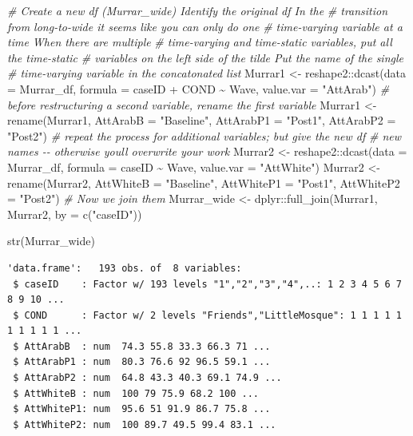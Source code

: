 \documentclass[
  11pt,
]{book}
\newenvironment{Shaded}{\begin{snugshade}}{\end{snugshade}}
\newcommand{\AttributeTok}[1]{\textcolor[rgb]{0.77,0.63,0.00}{#1}}
\newcommand{\CommentTok}[1]{\textcolor[rgb]{0.56,0.35,0.01}{\textit{#1}}}
\newcommand{\FunctionTok}[1]{\textcolor[rgb]{0.00,0.00,0.00}{#1}}
\newcommand{\NormalTok}[1]{#1}
\newcommand{\OtherTok}[1]{\textcolor[rgb]{0.56,0.35,0.01}{#1}}
\newcommand{\SpecialCharTok}[1]{\textcolor[rgb]{0.00,0.00,0.00}{#1}}
\newcommand{\StringTok}[1]{\textcolor[rgb]{0.31,0.60,0.02}{#1}}
\begin{document}
\begin{Shaded}
\begin{Highlighting}[]
\CommentTok{\# Create a new df (Murrar\_wide) Identify the original df In the}
\CommentTok{\# transition from long{-}to{-}wide it seems like you can only do one}
\CommentTok{\# time{-}varying variable at a time When there are multiple}
\CommentTok{\# time{-}varying and time{-}static variables, put all the time{-}static}
\CommentTok{\# variables on the left side of the tilde Put the name of the single}
\CommentTok{\# time{-}varying variable in the concatonated list}
\NormalTok{Murrar1 }\OtherTok{\textless{}{-}}\NormalTok{ reshape2}\SpecialCharTok{::}\FunctionTok{dcast}\NormalTok{(}\AttributeTok{data =}\NormalTok{ Murrar\_df, }\AttributeTok{formula =}\NormalTok{ caseID }\SpecialCharTok{+}\NormalTok{ COND }\SpecialCharTok{\textasciitilde{}}
\NormalTok{    Wave, }\AttributeTok{value.var =} \StringTok{"AttArab"}\NormalTok{)}
\CommentTok{\# before restructuring a second variable, rename the first variable}
\NormalTok{Murrar1 }\OtherTok{\textless{}{-}} \FunctionTok{rename}\NormalTok{(Murrar1, }\AttributeTok{AttArabB =} \StringTok{"Baseline"}\NormalTok{, }\AttributeTok{AttArabP1 =} \StringTok{"Post1"}\NormalTok{,}
    \AttributeTok{AttArabP2 =} \StringTok{"Post2"}\NormalTok{)}
\CommentTok{\# repeat the process for additional variables; but give the new df}
\CommentTok{\# new names {-}{-} otherwise you\textquotesingle{}ll overwrite your work}
\NormalTok{Murrar2 }\OtherTok{\textless{}{-}}\NormalTok{ reshape2}\SpecialCharTok{::}\FunctionTok{dcast}\NormalTok{(}\AttributeTok{data =}\NormalTok{ Murrar\_df, }\AttributeTok{formula =}\NormalTok{ caseID }\SpecialCharTok{\textasciitilde{}}\NormalTok{ Wave, }\AttributeTok{value.var =} \StringTok{"AttWhite"}\NormalTok{)}
\NormalTok{Murrar2 }\OtherTok{\textless{}{-}} \FunctionTok{rename}\NormalTok{(Murrar2, }\AttributeTok{AttWhiteB =} \StringTok{"Baseline"}\NormalTok{, }\AttributeTok{AttWhiteP1 =} \StringTok{"Post1"}\NormalTok{,}
    \AttributeTok{AttWhiteP2 =} \StringTok{"Post2"}\NormalTok{)}
\CommentTok{\# Now we join them}
\NormalTok{Murrar\_wide }\OtherTok{\textless{}{-}}\NormalTok{ dplyr}\SpecialCharTok{::}\FunctionTok{full\_join}\NormalTok{(Murrar1, Murrar2, }\AttributeTok{by =} \FunctionTok{c}\NormalTok{(}\StringTok{"caseID"}\NormalTok{))}

\FunctionTok{str}\NormalTok{(Murrar\_wide)}
\end{Highlighting}
\end{Shaded}

\begin{verbatim}
'data.frame':   193 obs. of  8 variables:
 $ caseID    : Factor w/ 193 levels "1","2","3","4",..: 1 2 3 4 5 6 7 8 9 10 ...
 $ COND      : Factor w/ 2 levels "Friends","LittleMosque": 1 1 1 1 1 1 1 1 1 1 ...
 $ AttArabB  : num  74.3 55.8 33.3 66.3 71 ...
 $ AttArabP1 : num  80.3 76.6 92 96.5 59.1 ...
 $ AttArabP2 : num  64.8 43.3 40.3 69.1 74.9 ...
 $ AttWhiteB : num  100 79 75.9 68.2 100 ...
 $ AttWhiteP1: num  95.6 51 91.9 86.7 75.8 ...
 $ AttWhiteP2: num  100 89.7 49.5 99.4 83.1 ...
\end{verbatim}
\end{document}
